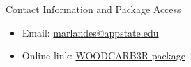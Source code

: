 \documentclass[final]{beamer}\usepackage[]{graphicx}\usepackage[]{color}
\newlength{\onecolwid}
\begin{document}
\begin{frame}[t]
\begin{columns}[t]
\begin{column}{\onecolwid}
\begin{alertblock}{Contact Information and Package Access}
\begin{itemize}
\item Email: \href{marlandes@appstate.edu}{marlandes@appstate.edu}
\item Online link: \href{http://benjones2.github.io/WOODCARB3R/}{WOODCARB3R package}
\end{itemize}
\vspace{0ex}
\begin{center}
\end{center}

\end{alertblock}



\end{column} %

\end{columns} %

\end{frame} %
\end{document}
